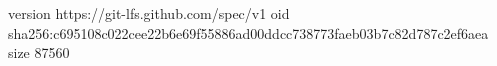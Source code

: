 version https://git-lfs.github.com/spec/v1
oid sha256:c695108c022cee22b6e69f55886ad00ddcc738773faeb03b7c82d787c2ef6aea
size 87560
